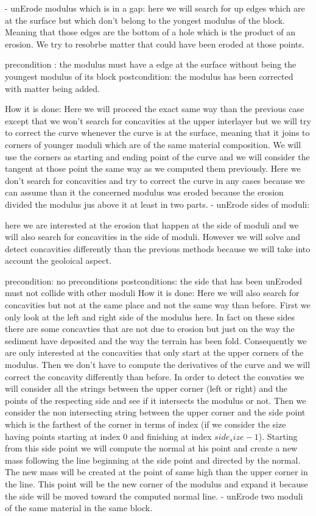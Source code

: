 \documentclass[12pt, a4paper]{memoir} %
\begin{document}
		- unErode modulus which is in a gap:
			here we will search for up edges which are at the surface but which don't belong to the yongest modulus of the block. Meaning that those edges are the bottom of a hole which is the product of an erosion. We try to resobrbe matter that could have been eroded at those points.
			
			precondition : the modulus must have a edge at the surface without being the youngest modulus of its block
			postcondition: the modulus has been corrected with matter being added.
			
			How it is done: Here we will proceed the exact same way than the previous case except that we won't search for concavities at the upper interlayer but we will try to correct the curve whenever the curve is at the surface, meaning that it joins to corners of younger moduli which are of the same material composition. We will use the corners as starting and ending point of the curve and we will consider the tangent at those point the same way as we computed them previously. Here we don't search for concavities and try to correct the curve in any cases because we can assume than it the concerned modulus was eroded because the erosion divided the modulus jus above it at least in two parts.
		- unErode sides of moduli:
		
			here we are interested at the erosion that happen at the side of moduli and we will also search for concavities in the side of moduli. However we will solve and detect concavities differently than the previous methods because we will take into account the geoloical aspect.
			
			precondition: no preconditions
			postconditions: the side that has been unEroded must not collide with other moduli
			How it is done: Here we will also search for concavities but not at the same place and not the same way than before. First we only look at the left and right side of the modulus here. In fact on these sides there are some concavties that are not due to erosion but just on the way the sediment have deposited and the way the terrain has been fold. Consequently we are only interested at the concavities that only start at the upper corners of the modulus. Then we don't have to compute the derivatives of the curve and we will correct the concavity differently than before. In order to detect the convaties we will consider all the strings between the upper corner (left or right) and the points of the respecting side and see if it intersects the modulus or not. Then we consider the non intersecting string between the upper corner and the side point which is the farthest of the corner in terms of index (if we consider the size having points starting at index $0$ and finishing at index $side_size - 1$). Starting from this side point we will compute the normal at his point and create a new mass following the line beginning at the side point and directed by the normal. The new mass will be created at the point of same high than the upper corner in the line. This point will be the new corner of the modulus and expand it because the side will be moved toward the computed normal line.
		- unErode two moduli of the same material in the same block.
		
\end{document}
